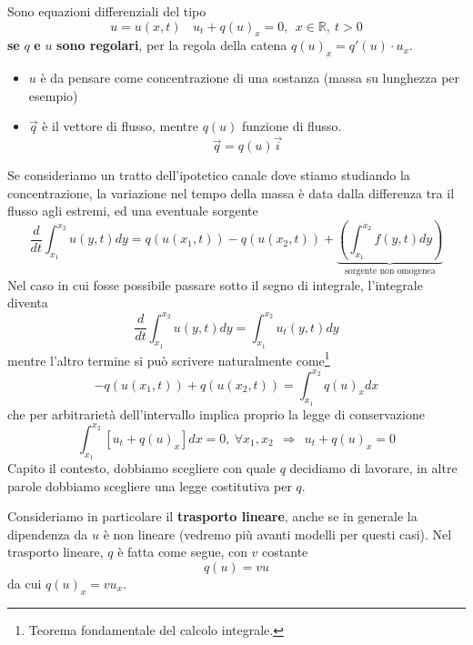\documentclass[10pt,a4paper,twoside,openright]{book}
\begin{document}
Sono equazioni differenziali del tipo
\begin{equation}
	u=u( x,t) \ \ \ \ u_{t} +q( u)_{x} =0,\ \ x\in \mathbb{R} ,\ t >0
\end{equation}
\textbf{se }$q$\textbf{ e }$u$\textbf{ sono regolari}, per la regola della catena $q( u)_{x} =q'( u) \cdotp u_{x}$.
\begin{itemize}
	\item $u$ è da pensare come concentrazione di una sostanza (massa su lunghezza per esempio)
	\item $\vec{q}$ è il vettore di flusso, mentre $q( u)$ funzione di flusso.
	      \begin{equation}
	      	\vec{q} =q( u)\vec{i}
	      \end{equation}
\end{itemize}

Se consideriamo un tratto dell'ipotetico canale dove stiamo studiando la concentrazione, la variazione nel tempo della massa è data dalla differenza tra il flusso agli estremi, ed una eventuale sorgente
\begin{equation*}
	\frac{d}{dt}\int ^{x_{2}}_{x_{1}} u( y,t) dy=q( u( x_{1} ,t)) -q( u( x_{2} ,t)) +\underbrace{\left(\int ^{x_{2}}_{x_{1}} f( y,t) dy\right)}_{\text{sorgente non omogenea}}
\end{equation*}
Nel caso in cui fosse possibile passare sotto il segno di integrale, l'integrale diventa
\begin{equation}
	\frac{d}{dt}\int ^{x_{2}}_{x_{1}} u( y,t) dy=\int ^{x_{2}}_{x_{1}} u_{t}( y,t) dy
	\label{eq:lc-passaggio-derivata-integrale}
\end{equation}
mentre l'altro termine si può scrivere naturalmente come\footnote{Teorema fondamentale del calcolo integrale.}
\begin{equation*}
	-q( u( x_{1} ,t)) +q( u( x_{2} ,t)) =\int ^{x_{2}}_{x_{1}} q( u)_{x} dx
\end{equation*}
che per arbitrarietà dell'intervallo implica proprio la legge di conservazione
\begin{equation*}
	\int ^{x_{2}}_{x_{1}}[ u_{t} +q( u)_{x}] dx=0,\ \forall x_{1} ,x_{2} \ \ \Rightarrow \ \ u_{t} +q( u)_{x} =0
\end{equation*}
Capito il contesto, dobbiamo scegliere con quale $q$ decidiamo di lavorare, in altre parole dobbiamo scegliere una legge costitutiva per $q$.

Consideriamo in particolare il \textbf{trasporto lineare}, anche se in generale la dipendenza da $u$ è non lineare (vedremo più avanti modelli per questi casi). Nel trasporto lineare, $q$ è fatta come segue, con $v$ costante
\begin{equation}
	q( u) =vu
\end{equation}
da cui $q( u)_{x} =vu_{x}$.
\end{document}
